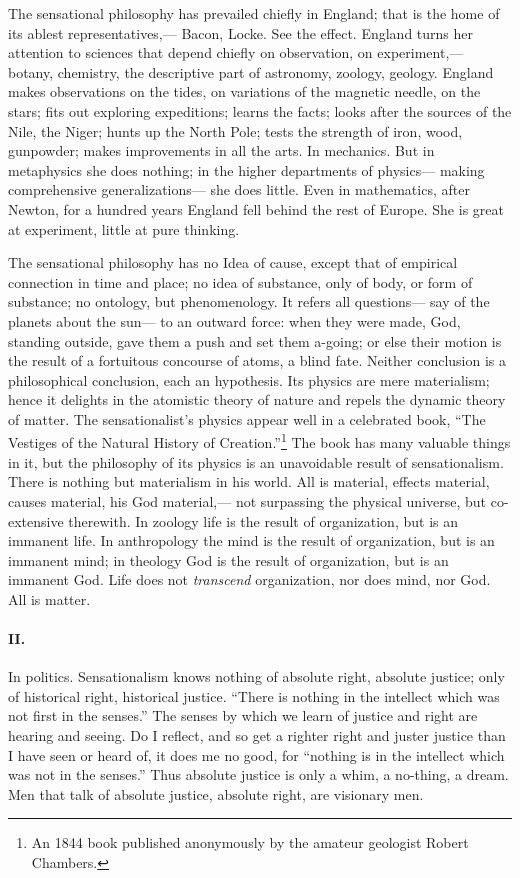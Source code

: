 \documentclass[12pt]{article}
\begin{document}
The sensational philosophy has prevailed chiefly in England; that is the home of its ablest representatives,--- Bacon, Locke. See the effect. England turns her attention to sciences that depend chiefly on observation, on experiment,--- botany, chemistry, the descriptive part of astronomy, zoology, geology. England makes observations on the tides, on variations of the magnetic needle, on the stars; fits out exploring expeditions; learns the facts; looks after the sources of the Nile, the Niger; hunts up the North Pole; tests the strength of iron, wood, gunpowder; makes improvements in all the arts. In mechanics. But in metaphysics she does nothing; in the higher departments of physics--- making comprehensive generalizations--- she does little. Even in mathematics, after Newton, for a hundred years England fell behind the rest of Europe. She is great at experiment, little at pure thinking. 

The sensational philosophy has no Idea of cause, except that of empirical connection in time and place; no idea of substance, only of body, or form of substance; no ontology, but phenomenology. It refers all questions--- say of the planets about the sun--- to an outward force: when they were made, God, standing outside, gave them a push and set them a-going; or else their motion is the result of a fortuitous concourse of atoms, a blind fate. Neither conclusion is a philosophical conclusion, each an hypothesis. Its physics are mere materialism; hence it delights in the atomistic theory of nature and repels the dynamic theory of matter. The sensationalist's physics appear well in a celebrated book, ``The Vestiges of the Natural History of Creation.''\footnote{An 1844 book published anonymously by the amateur geologist Robert Chambers.} The book has many valuable things in it, but the philosophy of its physics is an unavoidable result of sensationalism. There is nothing but materialism in his world. All is material, effects material, causes material, his God material,--- not surpassing the physical universe, but co-extensive therewith. In zoology life is the result of organization, but is an immanent life. In anthropology the mind is the result of organization, but is an immanent mind; in theology God is the result of organization, but is an immanent God. Life does not \emph{transcend} organization, nor does mind, nor God. All is matter. 

\paragraph{II.} In politics. Sensationalism knows nothing of absolute right, absolute justice; only of historical right, historical justice. ``There is nothing in the intellect which was not first in the senses.'' The senses by which we learn of justice and right are hearing and seeing. Do I reflect, and so get a righter right and juster justice than I have seen or heard of, it does me no good, for ``nothing is in the intellect which was not in the senses.'' Thus absolute justice is only a whim, a no-thing, a dream. Men that talk of absolute justice, absolute right, are visionary men.
\end{document}
